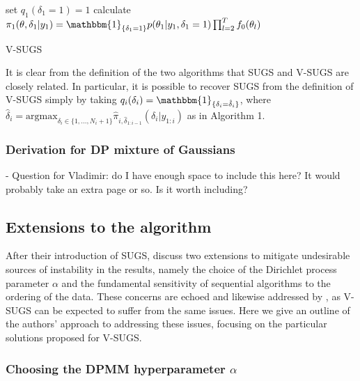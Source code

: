 \documentclass{uwstat572}
\begin{document}
\begin{algorithm}[H]
 set $q_1(\delta_1 = 1) = 1$ \;
 calculate $\pi_1(\theta,\delta_1 | y_1) =  \mathbbm{1}_{\{\delta_1 = 1\}} p(\theta_1 | y_1,\delta_1 = 1)\prod_{l=2}^T f_0(\theta_l)$ \;
 \caption{V-SUGS}
\end{algorithm}
\medskip

It is clear from the definition of the two algorithms that SUGS and V-SUGS are closely related. In particular, it is possible to recover SUGS from the definition of V-SUGS simply by taking $q_i(\delta_i) = \mathbbm{1}_{\{\delta_i = \hat{\delta}_i\}}$, where $\hat{\delta}_i = \mathrm{argmax}_{\delta_i \in \{1,...,N_i+1\}} \hat{\pi}_{i,\hat{\delta}_{1:i-1}}(\delta_i | y_{1:i})$ as in Algorithm 1.

\subsubsection{Derivation for DP mixture of Gaussians}

- Question for Vladimir: do I have enough space to include this here? It would probably take an extra page or so. Is it worth including?

\subsection{Extensions to the algorithm}

After their introduction of SUGS, \cite{wang} discuss two extensions to mitigate undesirable sources of instability in the results, namely the choice of the Dirichlet process parameter $\alpha$ and the fundamental sensitivity of sequential algorithms to the ordering of the data.  These concerns are echoed and likewise addressed by \cite{zhang}, as V-SUGS can be expected to suffer from the same issues. Here we give an outline of the authors' approach to addressing these issues, focusing on the particular solutions proposed for V-SUGS.

\subsubsection{Choosing the DPMM hyperparameter $\alpha$}
\end{document}
